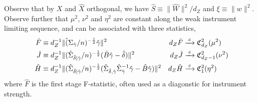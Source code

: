 \begin{remark}
Observe that by  \(X\) and \(\hat X\) orthogonal, we have \(\hat S \equiv \lVert \hat W\rVert^2/d_Z\) and \(\xi \equiv \lVert w \rVert^2\).
Observe further that \(\mu^2\), \(\nu^2\) and \(\eta^2\) are constant along the weak instrument limiting sequence, and can be associated with three statistics, 
\begin{align*}
    \hat F &\equiv d^{-1}_Z\lVert \hat (\Sigma_{\hat \gamma}/n)^{-\frac{1}{2}}\hat \gamma\rVert^2  & d_Z\hat F &\xrightarrow{{\scriptscriptstyle \mathrm{\;d\;}}} \mathfrak{C}^2_{d_Z}(\mu^2)\\ 
    \hat J &\equiv 
        d^{-1}_Z\lVert(\hat \Sigma_{\hat\delta \mid \hat\gamma}/n)^{-\frac{1}{2}}(\hat B \hat \gamma-\hat \delta)\rVert^2
        & d_Z\hat J &\xrightarrow{{\scriptscriptstyle \mathrm{\;d\;}}} \mathfrak{C}^2_{d_Z-1}(\nu^2)
        \\
        \hat H &\equiv 
        d^{-1}_Z\lVert(\hat \Sigma_{\hat\delta \mid \hat\gamma}/n)^{-\frac{1}{2}}(\hat \Sigma_{\hat \delta,\hat \gamma}\hat \Sigma_{\hat \gamma}^{-1} \hat \gamma-\hat B\hat \gamma)\rVert^2 
        & d_Z\hat H &\xrightarrow{{\scriptscriptstyle \mathrm{\;d\;}}} \mathfrak{C}^2_{1}(\eta^2)
\end{align*}
where \(\hat F\) is the first stage F-statistic, often used as a diagonstic for instrument strength.
\end{remark}

